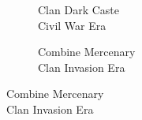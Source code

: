 \begin{figure}[!h]
  \begin{center}
  \begin{subfigure}{0.4\textwidth}
    \centering
    \caption*{Clan Dark Caste\\Civil War Era}
  \end{subfigure}
  \hspace{1in}
  \begin{subfigure}{0.4\textwidth}
    \centering
    \caption*{Combine Mercenary\\Clan Invasion Era}
  \end{subfigure}
  \end{center}
\end{figure}
